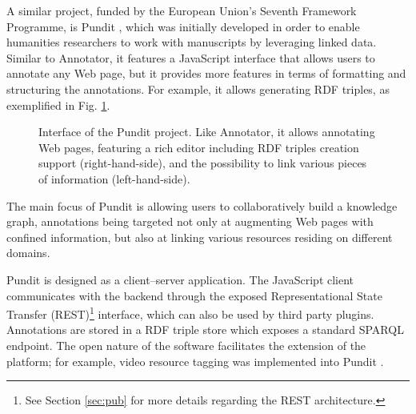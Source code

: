 A similar project, funded by the European Union's Seventh Framework Programme,
is Pundit \cite{ref:pundit}, which was initially developed in order to enable
humanities researchers to work with manuscripts by leveraging linked data.
Similar to Annotator, it features a JavaScript interface that allows users to
annotate any Web page, but it provides more features in terms of formatting and
structuring the annotations. For example, it allows generating RDF triples, as
exemplified in Fig. \ref{fig:pundit}.

\begin{figure}[p]
  \centering
  \caption[Interface of the Pundit project]
          {Interface of the Pundit project. Like Annotator, it allows
           annotating Web pages, featuring a rich editor
           including RDF triples creation support (right-hand-side), and
           the possibility to link various pieces of information
           (left-hand-side).}
  \label{fig:pundit}
\end{figure}

The main focus of Pundit is allowing users to collaboratively build a knowledge
graph, annotations being targeted not only at augmenting Web pages with
confined information, but also at linking various resources residing on
different domains.

Pundit is designed as a client--server application. The JavaScript client
communicates with the backend through the exposed Representational State
Transfer (REST)\footnote{See Section \ref{sec:pub} for more details regarding
the REST architecture.} interface, which can also be used by third party
plugins.  Annotations are stored in a RDF triple store which exposes a standard
SPARQL \cite{ref:sparql} endpoint. The open nature of the software facilitates
the extension of the platform; for example, video resource tagging was
implemented into Pundit \cite{ref:punditvideo}.

